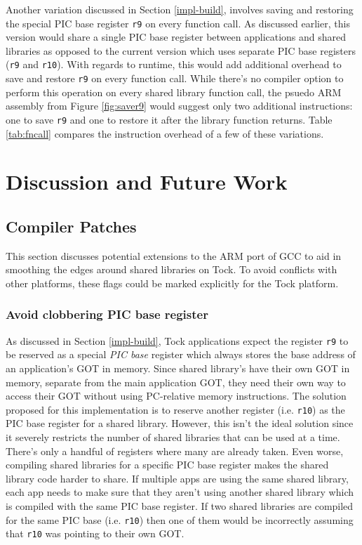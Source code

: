 \documentclass[12pt]{ucsddissertation}
\begin{document}
Another variation discussed in Section \ref{impl-build}, involves saving and restoring the special PIC base register \texttt{r9} on every function call. As discussed earlier, this version would share a single PIC base register between applications and shared libraries as opposed to the current version which uses separate PIC base registers (\texttt{r9} and \texttt{r10}). With regards to runtime, this would add additional overhead to save and restore \texttt{r9} on every function call. While there's no compiler option to perform this operation on every shared library function call, the psuedo ARM assembly from Figure \ref{fig:saver9} would suggest only two additional instructions: one to save \texttt{r9} and one to restore it after the library function returns. Table \ref{tab:fncall} compares the instruction overhead of a few of these variations.




\chapter{Discussion and Future Work}

\section{Compiler Patches} \label{compiler-patches}

This section discusses potential extensions to the ARM port of GCC to aid in smoothing the edges around shared libraries on Tock. To avoid conflicts with other platforms, these flags could be marked explicitly for the Tock platform.

\subsection{Avoid clobbering PIC base register}

As discussed in Section \ref{impl-build}, Tock applications expect the register \texttt{r9} to be reserved as a special \textit{PIC base} register which always stores the base address of an application's GOT in memory. Since shared library's have their own GOT in memory, separate from the main application GOT, they need their own way to access their GOT without using PC-relative memory instructions. The solution proposed for this implementation is to reserve another register (i.e. \texttt{r10}) as the PIC base register for a shared library. However, this isn't the ideal solution since it severely restricts the number of shared libraries that can be used at a time. There's only a handful of registers where many are already taken. Even worse, compiling shared libraries for a specific PIC base register makes the shared library code harder to share. If multiple apps are using the same shared library, each app needs to make sure that they aren't using another shared library which is compiled with the same PIC base register. If two shared libraries are compiled for the same PIC base (i.e. \texttt{r10}) then one of them would be incorrectly assuming that \texttt{r10} was pointing to their own GOT.   
\end{document}
